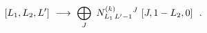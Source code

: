 \begin{equation}\label{mmAflowII}
[L_{1},L_{2},L']\ \longrightarrow \ \makebox[6cm][l]{$\displaystyle\bigoplus_{J}\
N^{(k)}_{L_{1}\, L'-1}{}^{J}\ [J,1-L_{2},0] \ \ .$}
\end{equation}

